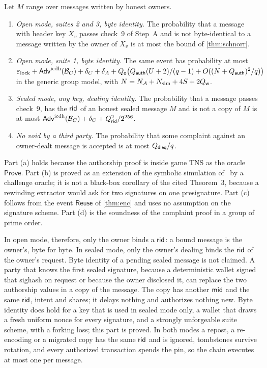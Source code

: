 \begin{theorem}\label{thm:auth}
Let $M$ range over messages written by honest owners.
\begin{enumerate}[leftmargin=1.9em,itemsep=2pt,label=\textup{(\alph*)}]
\item \emph{Open mode, suites 2 and 3, byte identity.} The probability that a message with header key $X_v$ passes check~9 of Step~A and is not byte-identical to a message written by the owner of $X_v$ is at most the bound of \cref{thm:schnorr}.
\item \emph{Open mode, suite 1, byte identity.} The same event has probability at most
$\varepsilon_{\mathrm{lock}} + \mathsf{Adv}^{\mathrm{icdh}}(\mathcal{B}_C) + \delta_C + \delta_A + Q_{\mathsf{o}}\bigl(Q_{\mathsf{auth}}(U+2)/(q-1) + O((N + Q_{\mathsf{auth}})^2/q)\bigr)$
in the generic group model, with $N = N_{\mathcal{A}} + N_{\mathrm{sim}} + 4S + 2Q_{\mathsf{w}}$.
\item \emph{Sealed mode, any key, dealing identity.} The probability that a message passes check~9, has the $\mathsf{rid}$ of an honest sealed message $M$ and is not a copy of $M$ is at most $\mathsf{Adv}^{\mathrm{icdh}}(\mathcal{B}_C) + \delta_C + Q_{\mathsf{rid}}^2/2^{256}$.
\item \emph{No void by a third party.} The probability that some complaint against an owner-dealt message is accepted is at most $Q_{\mathsf{dleq}}/q$.
\end{enumerate}
\end{theorem}

Part (a) holds because the authorship proof is inside game TNS as the oracle $\mathsf{Prove}$. Part (b) is proved as an extension of the symbolic simulation of~\cite{GS21} by a challenge oracle; it is not a black-box corollary of the cited Theorem~3, because a rewinding extractor would ask for two signatures on one presignature. Part (c) follows from the event $\mathsf{Reuse}$ of \cref{thm:enc} and uses no assumption on the signature scheme. Part (d) is the soundness of the complaint proof in a group of prime order.

In open mode, therefore, only the owner binds a $\mathsf{rid}$: a bound message is the owner's, byte for byte. In sealed mode, only the owner's dealing binds the $\mathsf{rid}$ of the owner's request. Byte identity of a pending sealed message is not claimed. A party that knows the first sealed signature, because a deterministic wallet signed that sighash on request or because the owner disclosed it, can replace the two authorship values in a copy of the message. The copy has another $\mathsf{mid}$ and the same $\mathsf{rid}$, intent and shares; it delays nothing and authorizes nothing new. Byte identity does hold for a key that is used in sealed mode only, a wallet that draws a fresh uniform nonce for every signature, and a strongly unforgeable suite scheme, with a forking loss; this part is proved. In both modes a repost, a re-encoding or a migrated copy has the same $\mathsf{rid}$ and is ignored, tombstones survive rotation, and every authorized transaction spends the pin, so the chain executes at most one per message.

